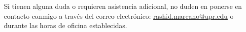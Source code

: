 \documentclass[11pt]{article}
\begin{document}
Si tienen alguna duda o requieren asistencia adicional, no duden en ponerse en contacto conmigo a través del correo electrónico: \href{mailto:rashid.marcano@upr.edu}{rashid.marcano@upr.edu} o durante las horas de oficina establecidas.

\printbibliography[title={Bibliografía}, heading=subbibliography]
\end{document}
